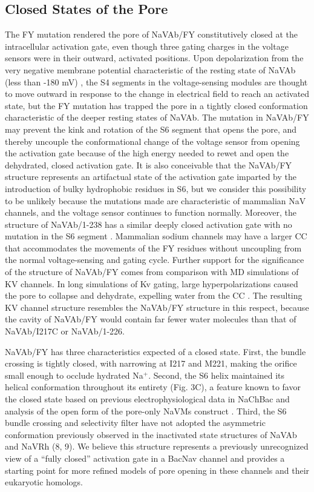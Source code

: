 \begin{refsection}
{\subsection{Closed States of the Pore}
The FY mutation rendered the pore of NaVAb/FY constitutively closed at the intracellular activation gate, even though three gating charges in the voltage sensors were in their outward, activated positions. Upon depolarization from the very negative membrane potential characteristic of the resting state of NaVAb (less than -180 mV) \cite{Payandeh:2012ib,Payandeh:2013ex}, the S4 segments in the voltage-sensing modules are thought to move outward in response to the change in electrical field to reach an activated state, but the FY mutation has trapped the pore in a tightly closed conformation characteristic of the deeper resting states of NaVAb. The mutation in NaVAb/FY may prevent the kink and rotation of the S6 segment that opens the pore, and thereby uncouple the conformational change of the voltage sensor from opening the activation gate because of the high energy needed to rewet and open the dehydrated, closed activation gate. It is also conceivable that the NaVAb/FY structure represents an artifactual state of the activation gate imparted by the introduction of bulky hydrophobic residues in S6, but we consider this possibility to be unlikely because the mutations made are characteristic of mammalian NaV channels, and the voltage sensor continues to function normally. Moreover, the structure of NaVAb/1-238 has a similar deeply closed activation gate with no mutation in the S6 segment \cite{Lenaeus:2017bf}. Mammalian sodium channels may have a larger CC that accommodates the movements of the FY residues without uncoupling from the normal voltage-sensing and gating cycle. Further support for the significance of the structure of NaVAb/FY comes from comparison with MD simulations of KV channels. In long simulations of Kv gating, large hyperpolarizations caused the pore to collapse and dehydrate, expelling water from the CC \cite{Jensen:2012ee}. The resulting KV channel structure resembles the NaVAb/FY structure in this respect, because the cavity of NaVAb/FY would contain far fewer water molecules than that of NaVAb/I217C or NaVAb/1-226.

NaVAb/FY has three characteristics expected of a closed state. First, the bundle crossing is tightly closed, with narrowing at I217 and M221, making the orifice small enough to occlude hydrated Na$^+$. Second, the S6 helix maintained its helical conformation throughout its entirety (Fig. 3C), a feature known to favor the closed state based on previous electrophysiological data in NaChBac and analysis of the open form of the pore-only NaVMs construct \cite{Zhao:2004vo,Bagneris:2013bu}. Third, the S6 bundle crossing and selectivity filter have not adopted the asymmetric conformation previously observed in the inactivated state structures of NaVAb and NaVRh (8, 9). We believe this structure represents a previously unrecognized view of a ``fully closed'' activation gate in a BacNav channel and provides a starting point for more refined models of pore opening in these channels and their eukaryotic homologs.

}
\end{refsection}
